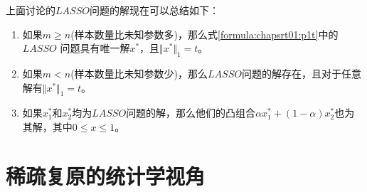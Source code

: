 上面讨论的$ LASSO $问题的解现在可以总结如下：
\begin{theorem}[Osborne et al., 2000b]\quad\par
\begin{enumerate}
	\item 如果$ m\geq n$(样本数量比未知参数多)，那么式\ref{formula:chapsrt01:p1t}中的$ LASSO$ 问题具有唯一解$ x^*$，且$ \Vert x^*\Vert_1 =t $。
	\item 如果$ m<n $(样本数量比未知参数少)，那么$ LASSO $问题的解存在，且对于任意解有$ \Vert x^*\Vert_1 =t $。
	\item 如果$ x_1^* $和$ x_2^* $均为$ LASSO $问题的解，那么他们的凸组合$\alpha x_1^* +(1-\alpha)x_2^* $也为其解，其中$ 0\leq x\leq 1 $。
\end{enumerate}
\end{theorem}


\section{稀疏复原的统计学视角}



